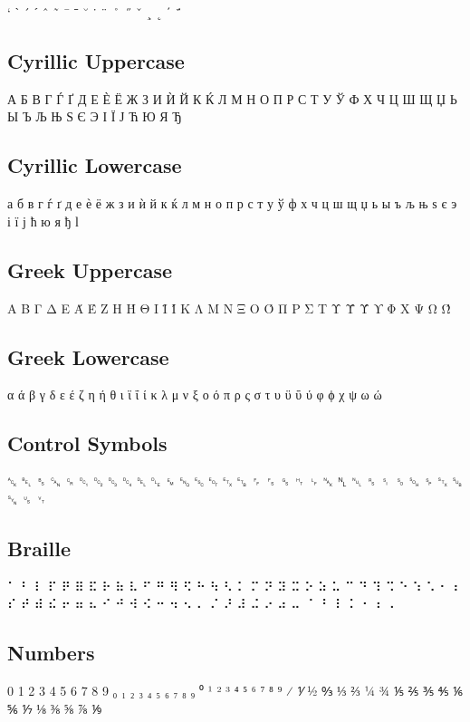 ` ˋ ´ ˊ ˆ ˜ ¯ ˉ ˘ ˙ ¨ ˚ ˝ ˇ ¸ ˛ ΄ ΅

\subsection{Cyrillic Uppercase}

А Б В Г Ѓ Ґ Д Е Ѐ Ё Ж З И Ѝ Й К Ќ Л М Н О П Р С Т У Ў Ф Х Ч Ц Ш Щ Џ Ь Ы Ъ Љ Њ Ѕ Є Э І Ї Ј Ћ Ю Я Ђ

\subsection{Cyrillic Lowercase}

а б в г ѓ ґ д е ѐ ё ж з и ѝ й к ќ л м н о п р с т у ў ф х ч ц ш щ џ ь ы ъ љ њ ѕ є э і ї ј ћ ю я ђ ӏ

\subsection{Greek Uppercase}

Α Β Γ Δ Ε Ά Έ Ζ Η Ή Θ Ι Ϊ Ί Κ Λ Μ Ν Ξ Ο Ό Π Ρ Σ Τ Υ Ϋ Ύ ϒ Φ Χ Ψ Ω Ώ

\subsection{Greek Lowercase}

α ά β γ δ ε έ ζ η ή θ ι ϊ ΐ ί κ λ μ ν ξ ο ό π ρ ς σ τ υ ϋ ΰ ύ φ ϕ χ ψ ω ώ

\subsection{Control Symbols}

␆ ␇ ␈ ␘ ␍ ␑ ␒ ␓ ␔ ␡ ␐ ␙ ␅ ␛ ␄ ␃ ␗ ␌ ␜ ␝ ␉ ␊ ␕ ␤ ␀ ␞ ␏ ␎ ␁ ␠ ␂ ␚ ␖ ␟ ␋

\subsection{Braille}

⠁ ⠃ ⠇ ⠏ ⠟ ⠿ ⠯ ⠗ ⠷ ⠧ ⠋ ⠛ ⠻ ⠫ ⠓ ⠳ ⠣ ⠅ ⠍ ⠝ ⠽ ⠭ ⠕ ⠵ ⠥ ⠉ ⠙ ⠹ ⠩ ⠑ ⠱ ⠡ ⠂ ⠆ ⠎ ⠞ ⠾ ⠮ ⠖ ⠶ ⠦ ⠊ ⠚ ⠺ ⠪ ⠒ ⠲ ⠢ ⠄ ⠌ ⠜ ⠼ ⠬ ⠔ ⠴ ⠤ ⠈ ⠘ ⠸ ⠨ ⠐ ⠰ ⠠

\subsection{Numbers}

0 1 2 3 4 5 6 7 8 9 ₀ ₁ ₂ ₃ ₄ ₅ ₆ ₇ ₈ ₉ ⁰ ¹ ² ³ ⁴ ⁵ ⁶ ⁷ ⁸ ⁹ ⁄ ⅟ ½ ↉ ⅓ ⅔ ¼ ¾ ⅕ ⅖ ⅗ ⅘ ⅙ ⅚ ⅐ ⅛ ⅜ ⅝ ⅞ ⅑

